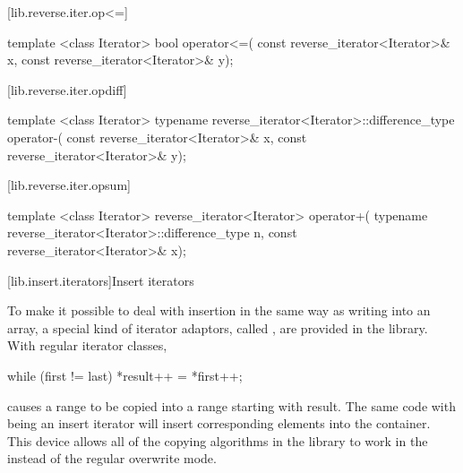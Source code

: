 [lib.reverse.iter.op<=]{}

%
\begin{itemdecl}
template <class Iterator>
  bool operator<=(
    const reverse_iterator<Iterator>& x,
    const reverse_iterator<Iterator>& y);
\end{itemdecl}

\begin{itemdescr}
\pnum
\returns
{}
\end{itemdescr}

[lib.reverse.iter.opdiff]{}

%
\begin{itemdecl}
template <class Iterator>
  typename reverse_iterator<Iterator>::difference_type operator-(
    const reverse_iterator<Iterator>& x,
    const reverse_iterator<Iterator>& y);
\end{itemdecl}

\begin{itemdescr}
\pnum
\returns
{}
\end{itemdescr}

[lib.reverse.iter.opsum]{}

%
\begin{itemdecl}
template <class Iterator>
  reverse_iterator<Iterator> operator+(
    typename reverse_iterator<Iterator>::difference_type n,
    const reverse_iterator<Iterator>& x);
\end{itemdecl}

\begin{itemdescr}
\pnum
\returns
{}
\end{itemdescr}

[lib.insert.iterators]{Insert iterators}

\pnum
To make it possible to deal with insertion in the same way as writing into an array, a special kind of iterator
adaptors, called
,
are provided in the library.
With regular iterator classes,

\begin{codeblock}
while (first != last) *result++ = *first++;
\end{codeblock}

\pnum
causes a range 
to be copied into a range starting with result.
The same code with
being an insert iterator will insert corresponding elements into the container.
This device allows all of the
copying algorithms in the library to work in the
instead of the regular overwrite mode.

